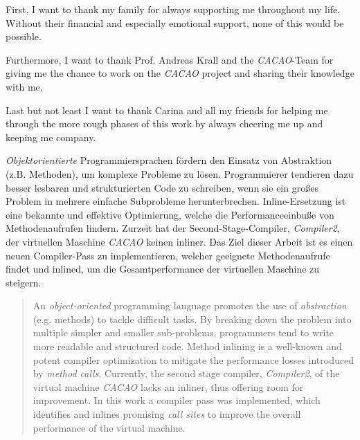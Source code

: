 \documentclass[draft, final]{vutinfth} %
\begin{document}
\frontmatter %


\begin{acknowledgements*}
First, I want to thank my family for always supporting me throughout my life. Without their financial and especially emotional support, none of this would be possible.

Furthermore, I want to thank Prof. Andreas Krall and the \textit{CACAO}-Team for giving me the chance to work on the \emph{CACAO} project and sharing their knowledge with me.

Last but not least I want to thank Carina and all my friends for helping me through the more rough phases of this work by always cheering me up and keeping me company.
\end{acknowledgements*}

\begin{kurzfassung}
\emph{Objektorientierte} Programmiersprachen fördern den Einsatz von Abstraktion (z.B. Methoden), um komplexe Probleme zu lösen. Programmierer tendieren dazu besser lesbaren und strukturierten Code zu schreiben, wenn sie ein großes Problem in mehrere einfache Subprobleme herunterbrechen. Inline-Ersetzung ist eine bekannte und effektive Optimierung, welche die Performanceeinbuße von Methodenaufrufen lindern. Zurzeit hat der Second-Stage-Compiler, \emph{Compiler2}, der virtuellen Maschine \emph{CACAO} keinen inliner. Das Ziel dieser Arbeit ist es einen neuen Compiler-Pass zu implementieren, welcher geeignete Methodenaufrufe findet und inlined, um die Gesamtperformance der virtuellen Maschine zu steigern.
\end{kurzfassung}

\begin{abstract}
An \emph{object-oriented} programming language promotes the use of \emph{abstraction} (e.g. methods) to tackle difficult tasks. By breaking down the problem into multiple simpler and smaller sub-problems, programmers tend to write more readable and structured code. Method inlining is a well-known and potent compiler optimization to mitigate the performance losses introduced by \emph{method calls}. Currently, the second stage compiler, \emph{Compiler2}, of the virtual machine \emph{CACAO} lacks an inliner, thus offering room for improvement. In this work a compiler pass was implemented, which identifies and inlines promising \emph{call sites} to improve the overall performance of the virtual machine.
\end{abstract}
\end{document}
